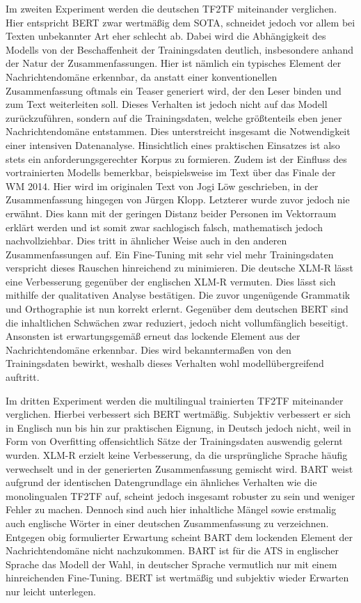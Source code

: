 \noindent
Im zweiten Experiment werden die deutschen \ac{TF2TF} miteinander verglichen. Hier entspricht \ac{BERT} zwar wertmäßig dem \ac{SOTA}, schneidet jedoch vor allem bei Texten unbekannter Art eher schlecht ab. Dabei wird die Abhängigkeit des Modells von der Beschaffenheit der Trainingsdaten deutlich, insbesondere anhand der Natur der Zusammenfassungen. Hier ist nämlich ein typisches Element der Nachrichtendomäne erkennbar, da anstatt einer konventionellen Zusammenfassung oftmals ein Teaser generiert wird, der den Leser binden und zum Text weiterleiten soll. Dieses Verhalten ist jedoch nicht auf das Modell zurückzuführen, sondern auf die Trainingsdaten, welche größtenteils eben jener Nachrichtendomäne entstammen. Dies unterstreicht insgesamt die Notwendigkeit einer intensiven Datenanalyse. Hinsichtlich eines praktischen Einsatzes ist also stets ein anforderungsgerechter Korpus zu formieren. Zudem ist der Einfluss des vortrainierten Modells bemerkbar, beispielsweise im Text über das Finale der WM 2014. Hier wird im originalen Text von Jogi Löw geschrieben, in der Zusammenfassung hingegen von Jürgen Klopp. Letzterer wurde zuvor jedoch nie erwähnt. Dies kann mit der geringen Distanz beider Personen im Vektorraum erklärt werden und ist somit zwar sachlogisch falsch, mathematisch jedoch nachvollziehbar. Dies tritt in ähnlicher Weise auch in den anderen Zusammenfassungen auf. Ein Fine-Tuning mit sehr viel mehr Trainingsdaten verspricht dieses Rauschen hinreichend zu minimieren. Die deutsche \ac{XLM-R} lässt eine Verbesserung gegenüber der englischen \ac{XLM-R} vermuten. Dies lässt sich mithilfe der qualitativen Analyse bestätigen. Die zuvor ungenügende Grammatik und Orthographie ist nun korrekt erlernt. Gegenüber dem deutschen \ac{BERT} sind die inhaltlichen Schwächen zwar reduziert, jedoch nicht vollumfänglich beseitigt. Ansonsten ist erwartungsgemäß erneut das lockende Element aus der Nachrichtendomäne erkennbar. Dies wird bekanntermaßen von den Trainingsdaten bewirkt, weshalb dieses Verhalten wohl modellübergreifend auftritt.
\newpage

\noindent
Im dritten Experiment werden die multilingual trainierten \ac{TF2TF} miteinander verglichen. Hierbei verbessert sich \ac{BERT} wertmäßig. Subjektiv verbessert er sich in Englisch nun bis hin zur praktischen Eignung, in Deutsch jedoch nicht, weil in Form von Overfitting offensichtlich Sätze der Trainingsdaten auswendig gelernt wurden. \ac{XLM-R} erzielt keine Verbesserung, da die ursprüngliche Sprache häufig verwechselt und in der generierten Zusammenfassung gemischt wird. \ac{BART} weist aufgrund der identischen Datengrundlage ein ähnliches Verhalten wie die monolingualen \ac{TF2TF} auf, scheint jedoch insgesamt robuster zu sein und weniger Fehler zu machen. Dennoch sind auch hier inhaltliche Mängel sowie erstmalig auch englische Wörter in einer deutschen Zusammenfassung zu verzeichnen. Entgegen obig formulierter Erwartung scheint \ac{BART} dem lockenden Element der Nachrichtendomäne nicht nachzukommen. \ac{BART} ist für die \ac{ATS} in englischer Sprache das Modell der Wahl, in deutscher Sprache vermutlich nur mit einem hinreichenden Fine-Tuning. \ac{BERT} ist wertmäßig und subjektiv wieder Erwarten nur leicht unterlegen.

